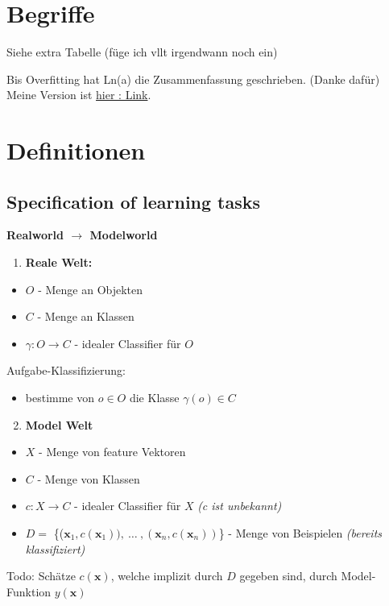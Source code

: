 \documentclass[11pt,a4paper]{article}
\author{Bianca}
\begin{document}
\begin{flushleft}
\section{Begriffe}

 Siehe extra Tabelle (füge ich vllt irgendwann noch ein)
 
 Bis Overfitting hat Ln(a) die Zusammenfassung geschrieben. (Danke dafür) Meine Version ist \href{ https://docs.google.com/document/d/1jQWYKyFCRYTOLqHAkhHsVKfAQX4yOiVxVZzob_jcLQ4/edit?usp=sharing }{hier : Link}.
\section{Definitionen}

\subsection{Specification of learning tasks}
    \textbf{Realworld $\rightarrow$ Modelworld} \newline
    \begin{enumerate}
    \item \textbf{Reale Welt:}
    \end{enumerate}
    \begin{itemize}
        \item $O$ - Menge an Objekten
        \item $C$ - Menge an Klassen
        \item $\gamma: O \rightarrow C$ - idealer Classifier für $O$
    \end{itemize}
    \quad Aufgabe-Klassifizierung:
    \begin{itemize}
        \item bestimme von $o \in O$ die Klasse $\gamma(o) \in C$
    \end{itemize}
    
    \begin{enumerate}
        \setcounter{enumi}{1}
        \item \textbf{Model Welt}
    \end{enumerate}
     \begin{itemize}
         \item $X$ - Menge von feature Vektoren
         \item $C$ - Menge von Klassen
         \item $c: X \rightarrow C$ - idealer Classifier für $X$ \textit{(c ist unbekannt)}
         \item $ D =$ \{($\textbf{x}_1,c(\textbf{x}_1)),\ \dots\ ,(\textbf{x}_n, c( \textbf{x}_n)) $\} - Menge von Beispielen \textit{(bereits klassifiziert)}
     \end{itemize}
    Todo: Schätze $c(\mathbf{x})$, welche implizit durch $D$ gegeben sind, durch
    \newline \quad Model-Funktion $y(\mathbf{x})$ 
    \newline\newline

\end{flushleft}
\end{document}
